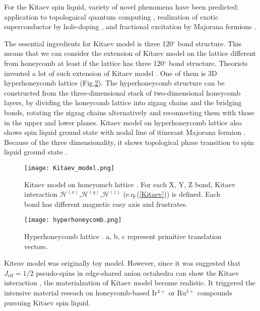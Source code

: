 For the Kitaev spin liquid, variety of novel phenomena have been predicted: application to topologaical quantum computing \cite{kitaev2006anyons},
realization of exotic superconductor by hole-doping \cite{you2012doping}, and fractional excitation by Majorana fermions \cite{nasu2015thermal, yoshitake2017temperature}.

The essential ingredients for Kitaev model is three 120$^\circ$ bond structure.
This means that we can consider the extension of Kitaev model on the lattice different from honeycomb at least if the lattice has three 120$^\circ$ bond structure.
Theorists invented a lot of such extension of Kitaev model \cite{o2016classification}.
One of them is 3D hyperhoneycomb lattice (Fig.\ref{hyperhoneycomb}).
The hyperhoneycomb structure can be constructed from the three-dimensional stack of two-dimensional honeycomb layers,
by dividing the honeycomb lattice into zigzag chains and the bridging bonds, rotating the zigzag chains alternatively and reconnecting them with those in the upper and lower planes.
Kitaev model on hyperhoneycomb lattice also shows spin liquid ground state with nodal line of itinerant Majorana fermion \cite{mandal2009exactly}.
Because of the three dimensionality, it shows topological phase transition to spin liquid ground state \cite{nasu2014vaporization}.

\begin{figure}
  \centering
  \texttt{[image: Kitaev\_model.png]}
  \caption{Kitaev model on honeyomcb lattice \cite{kitaev2006anyons, kitagawa2018spin}.
  For each X, Y, Z bond, Kitaev interaction $\mathcal{H}^{(x)}$,$\mathcal{H}^{(y)}$,$\mathcal{H}^{(z)}$ (e.q.(\ref{Kitaev})) is defined.
  Each bond has different magnetic easy axis and frustrates.}
  \label{Kitaev_model}
\end{figure}

\begin{figure}
  \centering
  \texttt{[image: hyperhoneycomb.png]}
  \caption{Hyperhoneycomb lattice \cite{nasu2014vaporization}. a, b, c represent primitive translation vectors.}
  \label{hyperhoneycomb}
\end{figure}

Kiteav model was originally toy model.
However, since it was suggested that $J_{\mathrm{eff}} = 1/2$ pseudo-spins in edge-shared anion octahedra can show the Kitaev interaction \cite{jackeli2009mott},
the materialzation of Kitaev model become realistic.
It triggered the intensive material reseach on honeycomb-based Ir$^{4+}$ or Ru$^{3+}$ compounds pursuing Kitaev spin liquid.

